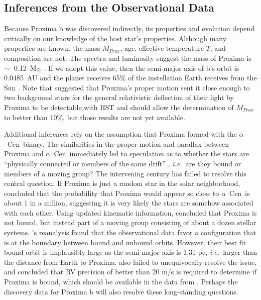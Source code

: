 \documentclass[preprint,12pt]{aastex}
\def\msun{{\rm\,M_\odot}}
\def\ie{{\it i.e.\ }}
\def\acen{{$\alpha$~Cen}}
\begin{document}
\subsection{Inferences from the Observational Data}
\label{sec:obs:inf}
Because Proxima b was discovered indirectly, its properties and
evolution depend critically on our knowledge of the host star's
properties. Although many properties are known, the mass $M_{Prox}$,
age, effective temperature $T$, and composition are not. The spectra and luminosity suggest
the mass of Proxima is $\sim~0.12~\msun$ \citep{Delfosse00}. If we
adopt this value, then the semi-major axis of b's orbit is 0.0485~AU
and the planet receives 65\% of the instellation Earth receives
from the Sun \citep{AngladaEscude16}.  Note that \cite{Sahu14}
suggested that Proxima's proper motion sent it close enough to two
background stars for the general relativistic deflection of their
light by Proxima to be detectable with HST and should allow the determination of
$M_{Prox}$ to better than 10\%, but those results are not yet available.

Additional inferences rely on the assumption that Proxima formed with
the \acen~binary.  The similarities in the proper motion and parallax
between Proxima and \acen~immediately led to speculation as to whether
the stars are ``physically connected or members of the same drift''
\citep{Voute1917}, \ie are they bound or members of a moving group?
The intervening century has failed to resolve this central
question. If Proxima is just a random star in the solar neighborhood,
\cite{MatthewsGilmore93} concluded that the probability that Proxima would
appear so close to \acen~is about 1 in a million, suggesting it is
very likely the stars are somehow associated with each other. Using
updated kinematic information, \cite{Anosova94} concluded that Proxima
is not bound, but instead part of a moving group consisting of about a
dozen stellar systems. \cite{WertheimerLaughlin06}'s reanalysis found
that the observational data favor a configuration that is at the
boundary between bound and unbound orbits. However, their best fit
bound orbit is implausibly large as the semi-major axis is 1.31 pc,
\ie larger than the distance from Earth to
Proxima. \cite{MatvienkoOrlov14} also failed to unequivocally resolve
the issue, and concluded that RV precision of better than 20 m/s is
required to determine if Proxima is bound, which should be available
in the data from \cite{AngladaEscude16}. Perhaps the discovery data
for Proxima b will also resolve these long-standing questions.
\end{document}
